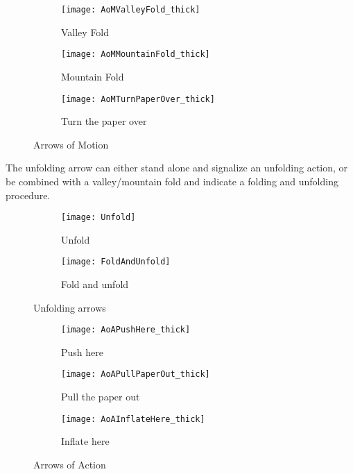 \begin{figure*}[h]
    \centering
    \begin{subfigure}[b]{0.3\textwidth}
        \texttt{[image: AoMValleyFold\_thick]}
        \caption{Valley Fold}
        \label{fig:aomValleyFold}
    \end{subfigure}
    \begin{subfigure}[b]{0.3\textwidth}
        \texttt{[image: AoMMountainFold\_thick]}
        \caption{Mountain Fold}
        \label{fig:aomMountainFold}
    \end{subfigure}
    \begin{subfigure}[b]{0.3\textwidth}
        \texttt{[image: AoMTurnPaperOver\_thick]}
        \caption{Turn the paper over}
        \label{fig:aomTurnPaperOver}
    \end{subfigure}
    \caption{Arrows of Motion}
    \label{fig:arrowsOfMotion}
\end{figure*}
The unfolding arrow can either stand alone and signalize an unfolding action, or be combined with a valley/mountain fold and indicate a folding and unfolding procedure.
\begin{figure*}[h]
	\centering
	\begin{subfigure}[b]{0.4\textwidth}
		\texttt{[image: Unfold]}
		\caption{Unfold}
		\label{fig:unfold}
	\end{subfigure}
	\begin{subfigure}[b]{0.3\textwidth}
		\texttt{[image: FoldAndUnfold]}
		\caption{Fold and unfold}
		\label{fig:foldAndUnfold}
	\end{subfigure}
	\caption{Unfolding arrows}
	\label{fig:unfoldingArrows}
\end{figure*}
%
\begin{figure*}[h]
    \centering
    \begin{subfigure}[b]{0.3\textwidth}
        \texttt{[image: AoAPushHere\_thick]}
        \caption{Push here}
        \label{fig:aoaPushHere}
    \end{subfigure}
    \begin{subfigure}[b]{0.3\textwidth}
        \texttt{[image: AoAPullPaperOut\_thick]}
        \caption{Pull the paper out}
        \label{fig:aoaPullPaperOut}
    \end{subfigure}
    \begin{subfigure}[b]{0.3\textwidth}
        \texttt{[image: AoAInflateHere\_thick]}
        \caption{Inflate here}
        \label{fig:aoaInflateHere}
    \end{subfigure}
    \caption{Arrows of Action}
    \label{fig:arrowsOfAction}
\end{figure*}

